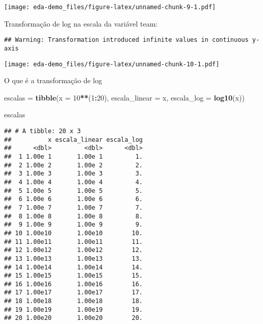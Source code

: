 \documentclass[]{article}
\newenvironment{Shaded}{\begin{snugshade}}{\end{snugshade}}
\newcommand{\KeywordTok}[1]{\textcolor[rgb]{0.13,0.29,0.53}{\textbf{#1}}}
\newcommand{\DataTypeTok}[1]{\textcolor[rgb]{0.13,0.29,0.53}{#1}}
\newcommand{\DecValTok}[1]{\textcolor[rgb]{0.00,0.00,0.81}{#1}}
\newcommand{\StringTok}[1]{\textcolor[rgb]{0.31,0.60,0.02}{#1}}
\newcommand{\OperatorTok}[1]{\textcolor[rgb]{0.81,0.36,0.00}{\textbf{#1}}}
\newcommand{\NormalTok}[1]{#1}
\begin{document}
\texttt{[image: eda-demo\_files/figure-latex/unnamed-chunk-9-1.pdf]}

Transformação de log na escala da variável team:

\begin{Shaded}
\end{Shaded}

\begin{verbatim}
## Warning: Transformation introduced infinite values in continuous y-axis
\end{verbatim}

\texttt{[image: eda-demo\_files/figure-latex/unnamed-chunk-10-1.pdf]}

O que é a transformação de log

\begin{Shaded}
\begin{Highlighting}[]
\NormalTok{escalas =}\StringTok{ }\KeywordTok{tibble}\NormalTok{(}\DataTypeTok{x =} \DecValTok{10}\OperatorTok{**}\NormalTok{(}\DecValTok{1}\OperatorTok{:}\DecValTok{20}\NormalTok{), }
                 \DataTypeTok{escala_linear =}\NormalTok{ x, }
                 \DataTypeTok{escala_log =} \KeywordTok{log10}\NormalTok{(x))}

\NormalTok{escalas}
\end{Highlighting}
\end{Shaded}

\begin{verbatim}
## # A tibble: 20 x 3
##          x escala_linear escala_log
##      <dbl>         <dbl>      <dbl>
##  1 1.00e 1       1.00e 1         1.
##  2 1.00e 2       1.00e 2         2.
##  3 1.00e 3       1.00e 3         3.
##  4 1.00e 4       1.00e 4         4.
##  5 1.00e 5       1.00e 5         5.
##  6 1.00e 6       1.00e 6         6.
##  7 1.00e 7       1.00e 7         7.
##  8 1.00e 8       1.00e 8         8.
##  9 1.00e 9       1.00e 9         9.
## 10 1.00e10       1.00e10        10.
## 11 1.00e11       1.00e11        11.
## 12 1.00e12       1.00e12        12.
## 13 1.00e13       1.00e13        13.
## 14 1.00e14       1.00e14        14.
## 15 1.00e15       1.00e15        15.
## 16 1.00e16       1.00e16        16.
## 17 1.00e17       1.00e17        17.
## 18 1.00e18       1.00e18        18.
## 19 1.00e19       1.00e19        19.
## 20 1.00e20       1.00e20        20.
\end{verbatim}
\end{document}
